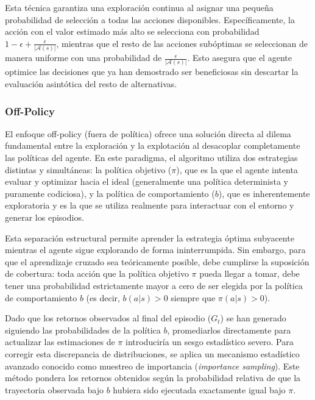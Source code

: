 Esta técnica garantiza una exploración continua al asignar una pequeña probabilidad de selección a todas las acciones disponibles. Específicamente, la acción con el valor estimado más alto se selecciona con probabilidad $1 - \epsilon + \frac{\epsilon}{|\mathcal{A}(s)|}$, mientras que el resto de las acciones subóptimas se seleccionan de manera uniforme con una probabilidad de $\frac{\epsilon}{|\mathcal{A}(s)|}$. Esto asegura que el agente optimice las decisiones que ya han demostrado ser beneficiosas sin descartar la evaluación asintótica del resto de alternativas.

\subsubsection{Off-Policy}

El enfoque off-policy (fuera de política) ofrece una solución directa al dilema fundamental entre la exploración y la explotación al desacoplar completamente las políticas del agente. En este paradigma, el algoritmo utiliza dos estrategias distintas y simultáneas: la política objetivo ($\pi$), que es la que el agente intenta evaluar y optimizar hacia el ideal (generalmente una política determinista y puramente codiciosa), y la política de comportamiento ($b$), que es inherentemente exploratoria y es la que se utiliza realmente para interactuar con el entorno y generar los episodios.

Esta separación estructural permite aprender la estrategia óptima subyacente mientras el agente sigue explorando de forma ininterrumpida. Sin embargo, para que el aprendizaje cruzado sea teóricamente posible, debe cumplirse la suposición de cobertura: toda acción que la política objetivo $\pi$ pueda llegar a tomar, debe tener una probabilidad estrictamente mayor a cero de ser elegida por la política de comportamiento $b$ (es decir, $b(a|s) > 0$ siempre que $\pi(a|s) > 0$).

Dado que los retornos observados al final del episodio ($G_t$) se han generado siguiendo las probabilidades de la política $b$, promediarlos directamente para actualizar las estimaciones de $\pi$ introduciría un sesgo estadístico severo. Para corregir esta discrepancia de distribuciones, se aplica un mecanismo estadístico avanzado conocido como muestreo de importancia (\textit{importance sampling}). Este método pondera los retornos obtenidos según la probabilidad relativa de que la trayectoria observada bajo $b$ hubiera sido ejecutada exactamente igual bajo $\pi$.

